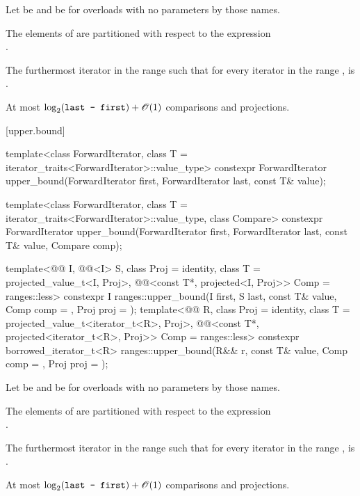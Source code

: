 \begin{itemdescr}
\pnum
Let  be  and
 be 
for overloads with no parameters by those names.

\pnum
\expects
The elements  of 
are partitioned with respect to the expression\\
.

\pnum
\returns
The furthermost iterator  in the range 
such that for every iterator  in the range ,
 is .

\pnum
\complexity
At most $\log_2(\tcode{last - first}) + \bigoh{1}$ comparisons and projections.
\end{itemdescr}

[upper.bound]{}

%
\begin{itemdecl}
template<class ForwardIterator, class T = iterator_traits<ForwardIterator>::value_type>
  constexpr ForwardIterator
    upper_bound(ForwardIterator first, ForwardIterator last,
                const T& value);

template<class ForwardIterator, class T = iterator_traits<ForwardIterator>::value_type,
         class Compare>
  constexpr ForwardIterator
    upper_bound(ForwardIterator first, ForwardIterator last,
                const T& value, Compare comp);

template<@@ I, @@<I> S, class Proj = identity,
         class T = projected_value_t<I, Proj>,
         @@<const T*, projected<I, Proj>> Comp = ranges::less>
  constexpr I ranges::upper_bound(I first, S last, const T& value, Comp comp = {}, Proj proj = {});
template<@@ R, class Proj = identity,
         class T = projected_value_t<iterator_t<R>, Proj>,
         @@<const T*, projected<iterator_t<R>, Proj>> Comp =
           ranges::less>
  constexpr borrowed_iterator_t<R>
    ranges::upper_bound(R&& r, const T& value, Comp comp = {}, Proj proj = {});
\end{itemdecl}

\begin{itemdescr}
\pnum
Let  be  and
 be 
for overloads with no parameters by those names.

\pnum
\expects
The elements  of 
are partitioned with respect to the expression\\
.

\pnum
\returns
The furthermost iterator  in the range 
such that for every iterator  in the range ,
 is .

\pnum
\complexity
At most $\log_2(\tcode{last - first}) + \bigoh{1}$ comparisons and projections.
\end{itemdescr}


